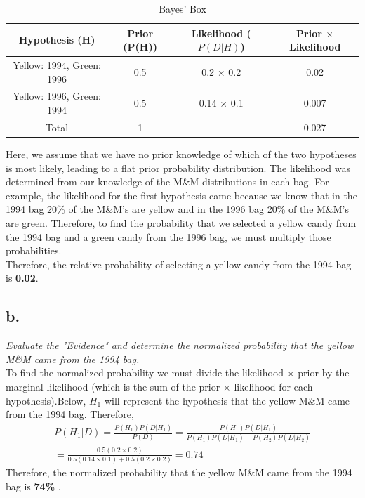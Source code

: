 \documentclass[english,12pt]{article}
\begin{document}

\begin{table}[H]
\caption{Bayes' Box} %
\centering %
\begin{tabular}{|c| c| c |c|} %
\hline\hline %
Hypothesis (H) & Prior (P(H)) & Likelihood ($P(D|H)$) & Prior $\times$ Likelihood  \\ [0.5ex] %
\hline %
Yellow: 1994, Green: 1996 & 0.5 & 0.2 $\times$ 0.2 & 0.02 \\ %
Yellow: 1996, Green: 1994 & 0.5 & 0.14 $\times$ 0.1 & 0.007 \\
\hline
Total & 1& &0.027 \\
\hline %
\end{tabular}
\label{table:nonlin} %
\end{table}

Here, we assume that we have no prior knowledge of which of the two hypotheses is most likely, leading to a flat prior probability distribution. The likelihood was determined from our knowledge of the M\&M distributions in each bag. For example, the likelihood for the first hypothesis came because we know that in the 1994 bag 20\% of the M\&M's are yellow and in the 1996 bag 20\% of the M\&M's are green. Therefore, to find the probability that we selected a yellow candy from the 1994 bag and a green candy from the 1996 bag, we must multiply those probabilities.\\

Therefore, the relative probability of selecting a yellow candy from the 1994 bag is \textbf{0.02}.

\subsection*{b.}
\textit{Evaluate the "Evidence" and determine the normalized probability that the yellow M\&M came from the 1994 bag.}\\
To find the normalized probability we must divide the likelihood $\times$  prior by the marginal likelihood (which is the sum of the prior $\times$ likelihood for each hypothesis).Below, $H_1$ will represent the hypothesis that the yellow M\&M came from the 1994 bag. Therefore, 
\begin{multline}
P(H_1|D) = \frac{P(H_1)P(D|H_1)}{P(D)} =  \frac{P(H_1)P(D|H_1)}{P(H_1)P(D|H_1) + P(H_2)P(D|H_2)}  \\ = \frac{0.5(0.2 \times 0.2)}{0.5(0.14\times 0.1)+0.5(0.2 \times 0.2)} = 0.74
\end{multline}
Therefore, the normalized probability that the yellow M\&M came from the 1994 bag is \textbf{74\%} .
\end{document}
